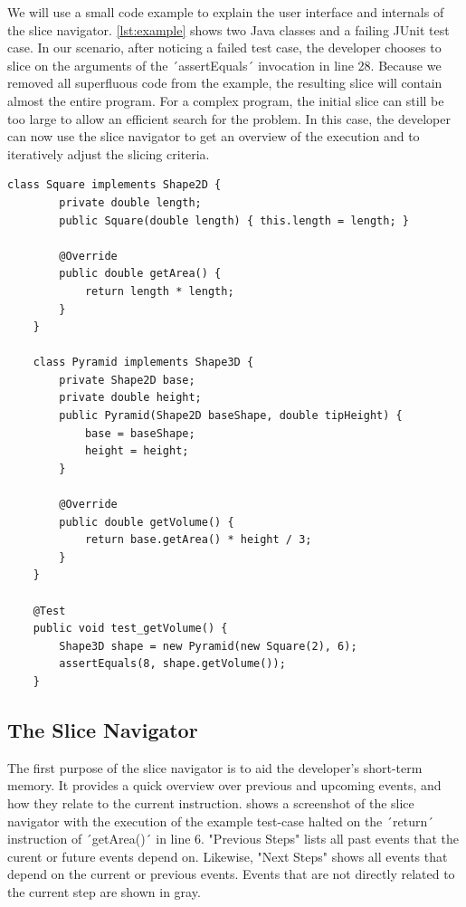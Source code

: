 ﻿\documentclass[
      english,
			conference,
      ]{IEEEtran}
\begin{document}
We will use a small code example to explain the user interface and internals of the slice navigator. 
\autoref{lst:example} shows two Java classes and a failing JUnit test case.
In our scenario, after noticing a failed test case, the developer chooses to slice on the arguments of the ´assertEquals´ invocation in line 28.
Because we removed all superfluous code from the example, the resulting slice will contain almost the entire program.
For a complex program, the initial slice can still be too large to allow an efficient search for the problem.
In this case, the developer can now use the slice navigator to get an overview of the execution and to iteratively adjust the slicing criteria.

\begin{lstlisting}[numberfirstline=true,firstnumber=1,label=lst:example,caption={Example program with a failing test case}]
	class Square implements Shape2D {
		private double length;
		public Square(double length) { this.length = length; }
		
		@Override
		public double getArea() { 
			return length * length; 
		}
	}
	
	class Pyramid implements Shape3D {
		private Shape2D base;
		private double height;
		public Pyramid(Shape2D baseShape, double tipHeight) {
			base = baseShape;
			height = height;
		}
		
		@Override
		public double getVolume() { 
			return base.getArea() * height / 3; 
		}
	}
	
	@Test
	public void test_getVolume() {
		Shape3D shape = new Pyramid(new Square(2), 6);
		assertEquals(8, shape.getVolume());
	}
\end{lstlisting}

\subsection{The Slice Navigator}

The first purpose of the slice navigator is to aid the developer's short-term memory.
It provides a quick overview over previous and upcoming events, and how they relate to the current instruction.
 shows a screenshot of the slice navigator with the execution of the example test-case halted on the ´return´ instruction of ´getArea()´ in line 6.
"Previous Steps" lists all past events that the curent or future events depend on.
Likewise, "Next Steps" shows all events that depend on the current or previous events.
Events that are not directly related to the current step are shown in gray.
\end{document}
